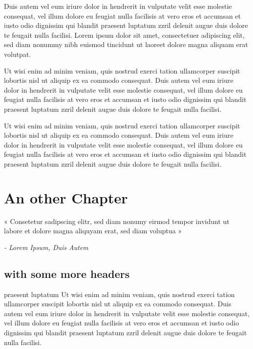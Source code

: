 \documentclass[10pt,twoside,twocolumn,openany,nodeprecatedcode]{dndbook}
\begin{document}
Duis autem vel eum iriure dolor in hendrerit in vulputate velit esse molestie consequat, vel illum dolore eu feugiat nulla facilisis at vero eros et accumsan et iusto odio dignissim qui blandit praesent luptatum zzril delenit augue duis dolore te feugait nulla facilisi. Lorem ipsum dolor sit amet, consectetuer adipiscing elit, sed diam nonummy nibh euismod tincidunt ut laoreet dolore magna aliquam erat volutpat. 

\begin{DndReadAloud}{}
Ut wisi enim ad minim veniam, quis nostrud exerci tation ullamcorper suscipit lobortis nisl ut aliquip ex ea commodo consequat. Duis autem vel eum iriure dolor in hendrerit in vulputate velit esse molestie consequat, vel illum dolore eu feugiat nulla facilisis at vero eros et accumsan et iusto odio dignissim qui blandit praesent luptatum zzril delenit augue duis dolore te feugait nulla facilisi. 

\end{DndReadAloud}

\begin{DndComment}{}
Ut wisi enim ad minim veniam, quis nostrud exerci tation ullamcorper suscipit lobortis nisl ut aliquip ex ea commodo consequat. Duis autem vel eum iriure dolor in hendrerit in vulputate velit esse molestie consequat, vel illum dolore eu feugiat nulla facilisis at vero eros et accumsan et iusto odio dignissim qui blandit praesent luptatum zzril delenit augue duis dolore te feugait nulla facilisi. 

\end{DndComment}

\chapter{An other Chapter}

\begingroup
\DndSetThemeColor[DmgLavender]\begin{DndSidebar}{}
\Large \centering «
\large \centering Consetetur sadipscing elitr, sed diam nonumy eirmod tempor invidunt ut labore et dolore magna aliquyam erat, sed diam voluptua
\Large »
 
 \normalsize \raggedleft \textit{ - Lorem Ipsum, Duis Autem}
\end{DndSidebar}
\endgroup
\section{with some more headers}

\begin{DndComment}{praesent luptatum}
Ut wisi enim ad minim veniam, quis nostrud exerci tation ullamcorper suscipit lobortis nisl ut aliquip ex ea commodo consequat. Duis autem vel eum iriure dolor in hendrerit in vulputate velit esse molestie consequat, vel illum dolore eu feugiat nulla facilisis at vero eros et accumsan et iusto odio dignissim qui blandit praesent luptatum zzril delenit augue duis dolore te feugait nulla facilisi. 

\end{DndComment}
\end{document}
